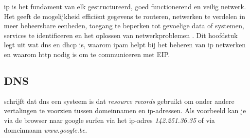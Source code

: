 \acrfull{ip} is het fundament van elk gestructureerd, goed functionerend en veilig netwerk. Het geeft de mogelijkheid efficiënt gegevens te routeren, netwerken te verdelen in meer beheersbare eenheden, toegang te beperken tot gevoelige data of systemen, services te identificeren en het oplossen van netwerkproblemen \autocite{Postel1981}. Dit hoofdstuk legt uit wat \acrfull{dns} en \acrfull{dhcp} is, waarom \acrshort{ipam} helpt bij het beheren van \acrshort{ip} netwerken en waarom \acrshort{http} nodig is om te communiceren met EIP. 


\subsection{DNS}
\textcite{Mockapetris1987} schrijft dat \acrshort{dns} een systeem is dat \textit{resource records} gebruikt om onder andere vertalingen te voorzien tussen domeinnamen en \acrshort{ip}-adressen. Als voorbeeld kan je via de browser naar google surfen via het \acrshort{ip}-adres \textit{142.251.36.35} of via domeinnaam \textit{www.google.be}.

